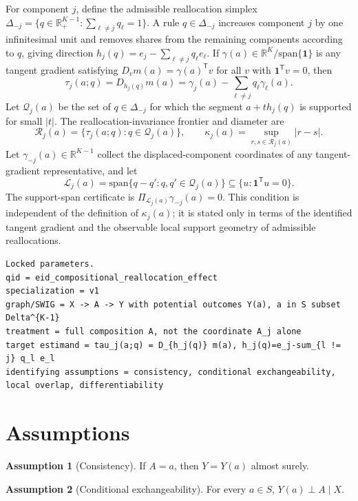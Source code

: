 \documentclass[11pt]{article}
\newcommand{\one}{\mathbf{1}}
\newcommand{\transpose}{\mathsf{T}}
\newcommand{\R}{\mathbb{R}}
\theoremstyle{definition}
\newtheorem{assumption}{Assumption}
\theoremstyle{plain}
\theoremstyle{remark}
\begin{document}
For component \(j\), define the admissible reallocation simplex \(\Delta_{-j}=\{q\in\R_+^{K-1}:\sum_{\ell\neq j}q_\ell=1\}\). A rule \(q\in\Delta_{-j}\) increases component \(j\) by one infinitesimal unit and removes shares from the remaining components according to \(q\), giving direction \(h_j(q)=e_j-\sum_{\ell\neq j}q_\ell e_\ell\). If \(\gamma(a)\in\R^K/\mathrm{span}\{\one\}\) is any tangent gradient satisfying \(D_v m(a)=\gamma(a)^\transpose v\) for all \(v\) with \(\one^\transpose v=0\), then
\[
\tau_j(a;q)=D_{h_j(q)}m(a)=\gamma_j(a)-\sum_{\ell\neq j}q_\ell\gamma_\ell(a).
\]
Let \(\mathcal{Q}_j(a)\) be the set of \(q\in\Delta_{-j}\) for which the segment \(a+t h_j(q)\) is supported for small \(|t|\). The reallocation-invariance frontier and diameter are
\[
\mathcal{R}_j(a)=\{\tau_j(a;q):q\in\mathcal{Q}_j(a)\},\qquad
\kappa_j(a)=\sup_{r,s\in\mathcal{R}_j(a)}|r-s|.
\]
Let \(\gamma_{-j}(a)\in\R^{K-1}\) collect the displaced-component coordinates of any tangent-gradient representative, and let
\[
\mathcal{L}_j(a)=\mathrm{span}\{q-q':q,q'\in\mathcal{Q}_j(a)\}\subseteq\{u:\one^\transpose u=0\}.
\]
The support-span certificate is \(\Pi_{\mathcal{L}_j(a)}\gamma_{-j}(a)=0\). This condition is independent of the definition of \(\kappa_j(a)\); it is stated only in terms of the identified tangent gradient and the observable local support geometry of admissible reallocations.

\begin{verbatim}
Locked parameters.
qid = eid_compositional_reallocation_effect
specialization = v1
graph/SWIG = X -> A -> Y with potential outcomes Y(a), a in S subset Delta^{K-1}
treatment = full composition A, not the coordinate A_j alone
target estimand = tau_j(a;q) = D_{h_j(q)} m(a), h_j(q)=e_j-sum_{l != j} q_l e_l
identifying assumptions = consistency, conditional exchangeability, local overlap, differentiability
\end{verbatim}

\section{Assumptions}
\begin{assumption}[Consistency]\label{ass:consistency}
If \(A=a\), then \(Y=Y(a)\) almost surely.
\end{assumption}

\begin{assumption}[Conditional exchangeability]\label{ass:exchangeability}
For every \(a\in S\), \(Y(a)\perp A\mid X\).
\end{assumption}
\end{document}
